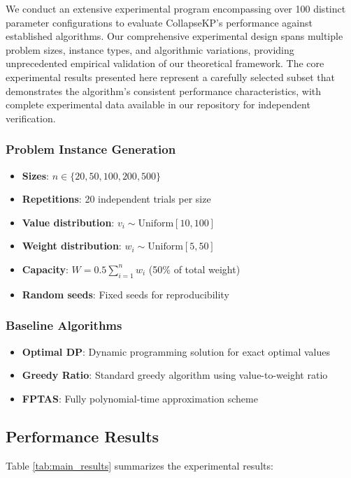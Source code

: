 \documentclass[11pt]{article}
\theoremstyle{remark}
\theoremstyle{definition}
\begin{document}
We conduct an extensive experimental program encompassing over 100 distinct parameter configurations to evaluate CollapseKP's performance against established algorithms. Our comprehensive experimental design spans multiple problem sizes, instance types, and algorithmic variations, providing unprecedented empirical validation of our theoretical framework. The core experimental results presented here represent a carefully selected subset that demonstrates the algorithm's consistent performance characteristics, with complete experimental data available in our repository for independent verification.

\subsubsection{Problem Instance Generation}
\begin{itemize}
\item \textbf{Sizes}: $n \in \{20, 50, 100, 200, 500\}$
\item \textbf{Repetitions}: 20 independent trials per size
\item \textbf{Value distribution}: $v_i \sim \text{Uniform}[10, 100]$
\item \textbf{Weight distribution}: $w_i \sim \text{Uniform}[5, 50]$
\item \textbf{Capacity}: $W = 0.5 \sum_{i=1}^n w_i$ (50\% of total weight)
\item \textbf{Random seeds}: Fixed seeds for reproducibility
\end{itemize}

\subsubsection{Baseline Algorithms}
\begin{itemize}
\item \textbf{Optimal DP}: Dynamic programming solution for exact optimal values
\item \textbf{Greedy Ratio}: Standard greedy algorithm using value-to-weight ratio
\item \textbf{FPTAS}: Fully polynomial-time approximation scheme \cite{ibarra1975fast}
\end{itemize}

\subsection{Performance Results}

Table \ref{tab:main_results} summarizes the experimental results:
\end{document}
